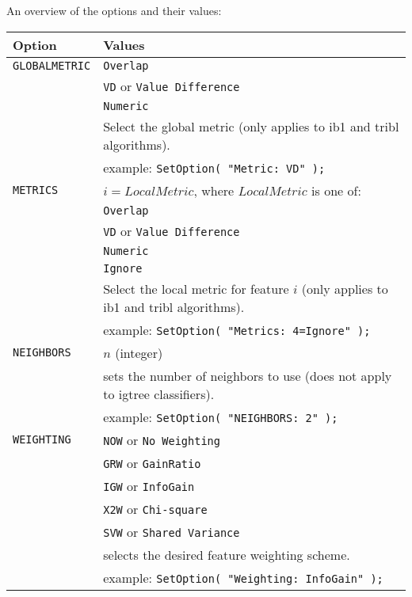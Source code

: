 \documentclass{report}
\begin{document}
\noindent
An overview of the options and their values:\\[2ex]
\begin{tabular}{|l|p{12cm}|}
\hline
Option & Values\\
\hline
{\tt GLOBALMETRIC} &  {\tt Overlap}\\
	     &  {\tt VD} or {\tt Value Difference}\\
	     &  {\tt Numeric} \\
	     & Select the global metric (only applies to {\sc ib1} and {\sc tribl} algorithms).\\
	     & example: {\tt SetOption( "Metric: VD" );}\\
\hline
{\tt METRICS} &  $i=LocalMetric$, where $LocalMetric$ is one of:\\
	     &  {\tt Overlap}\\
	     &  {\tt VD} or {\tt Value Difference}\\
	     &  {\tt Numeric} \\
	     &  {\tt Ignore}\\
	     & Select the local metric for feature $i$ (only applies to {\sc ib1} and {\sc tribl} algorithms).\\
	     & example: {\tt SetOption( "Metrics: 4=Ignore" );}\\
\hline
{\tt NEIGHBORS} & $n$ (integer)\\
		 & sets the number of neighbors to use (does not apply
to {\sc igtree} classifiers).\\
		 & example: {\tt SetOption( "NEIGHBORS: 2" );}\\
\hline
{\tt WEIGHTING}  & {\tt NOW} or {\tt No Weighting}\\
                 &  {\tt GRW} or {\tt GainRatio}\\
                 &  {\tt IGW} or {\tt InfoGain}\\
                 &  {\tt X2W} or {\tt Chi-square}\\
                 &  {\tt SVW} or {\tt Shared Variance}\\
		 & selects the desired feature weighting scheme.\\
		 & example: {\tt SetOption( "Weighting: InfoGain" );}\\
\hline
\end{tabular}
\end{document}
